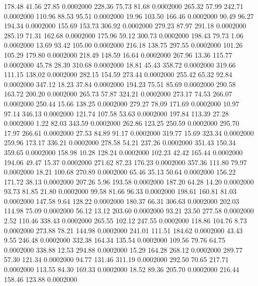  178.48   41.56   27.85   0.0002000
 228.36   75.73   81.68   0.0002000
 265.32   57.99  242.71   0.0002000
 110.96   88.53   95.51   0.0002000
  19.96  103.50  166.46   0.0002000
  90.49   96.27  194.34   0.0002000
 155.69  153.73  306.92   0.0002000
 279.23   87.97  291.18   0.0002000
 285.19   71.31  162.68   0.0002000
 175.96   59.12  300.73   0.0002000
 198.43   79.73    1.06   0.0002000
  13.69   93.42  105.00   0.0002000
 216.18  138.75  297.55   0.0002000
 101.26  105.29  179.80   0.0002000
 218.49  148.59   16.64   0.0002000
 267.96   13.36  115.77   0.0002000
  45.78   28.39  310.68   0.0002000
  18.81   45.43  358.72   0.0002000
 319.66  111.15  138.02   0.0002000
 282.15  154.59  273.44   0.0002000
 255.42   65.32   92.84   0.0002000
 347.12   18.23   37.84   0.0002000
 194.23   75.51   85.69   0.0002000
 290.58  163.72  200.20   0.0002000
 265.73   57.87  324.21   0.0002000
 273.17   74.53  266.07   0.0002000
 250.44   15.66  138.25   0.0002000
 279.27   78.09  171.69   0.0002000
  10.97   97.14  346.13   0.0002000
 121.74  107.58   53.63   0.0002000
 197.84  113.39   27.28   0.0002000
   1.22   82.03  343.59   0.0002000
 262.86  123.25  250.59   0.0002000
 295.70   17.97  266.61   0.0002000
  27.53   84.89   91.17   0.0002000
 319.77   15.69  323.34   0.0002000
 259.96  173.17  336.21   0.0002000
 278.58   54.21  237.26   0.0002000
 351.43  150.34  359.65   0.0002000
 158.98   10.28  128.24   0.0002000
 102.23   42.42  165.44   0.0002000
 194.06   49.47   15.37   0.0002000
 271.62   87.23  176.23   0.0002000
 357.36  111.80   79.97   0.0002000
  18.21  100.68  270.89   0.0002000
  65.46   35.13   50.64   0.0002000
 156.22  171.72   38.13   0.0002000
 207.26    5.96  193.58   0.0002000
 187.20   64.28   14.20   0.0002000
  93.73   81.85   21.80   0.0002000
  99.58   81.66   96.33   0.0002000
 198.61  160.81   81.03   0.0002000
 147.58    9.64  128.22   0.0002000
 180.37   66.31  306.63   0.0002000
 202.03  114.98   75.09   0.0002000
  56.12   13.12  203.60   0.0002000
  93.21   23.50  277.58   0.0002000
   2.52  110.46  338.43   0.0002000
 265.55  102.12  247.55   0.0002000
 118.86  104.76    8.73   0.0002000
 273.88   78.21  144.98   0.0002000
 241.01  111.51  184.62   0.0002000
  43.43    9.55  246.48   0.0002000
 332.38  164.34  135.54   0.0002000
 109.56   79.76   64.75   0.0002000
 338.88   12.53  294.88   0.0002000
  15.29  164.28  268.12   0.0002000
 289.77   57.30  121.34   0.0002000
  94.77  131.46  311.19   0.0002000
 292.50   70.65  217.71   0.0002000
 113.55   84.30  169.33   0.0002000
  18.52   89.36  205.70   0.0002000
 216.44  158.46  123.88   0.0002000
